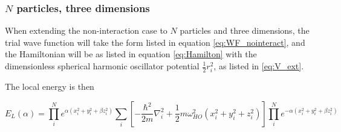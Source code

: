\documentclass[norsk,a4paper,12pt]{article}
\begin{document}

\subsubsection{$N$ particles, three dimensions}

When extending the non-interaction case to $N$ particles and three dimensions, the trial wave function will take the form listed in equation \ref{eq:WF_nointeract}, and the Hamiltonian will be as listed in equation \ref{eq:Hamilton} with the dimensionless spherical harmonic oscillator potential $\frac{1}{2}r_i^2$, as listed in \ref{eq:V_ext}.

\iffalse
The local energy is then

\begin{equation}
	E_L(\alpha) = \prod_i^N e^{\alpha(x_i^2 + y_i^2 + \beta z_i^2)} \sum_i [ -\frac{\hbar^2}{2m} \nabla_i^2 + \frac{1}{2}m\omega_{HO}^2(x_i^2 + y_i^2 + z_i^2)] \prod_i^N e^{-\alpha(x_i^2 + y_i^2 + \beta z_i^2)}
\end{equation}
\end{document}
